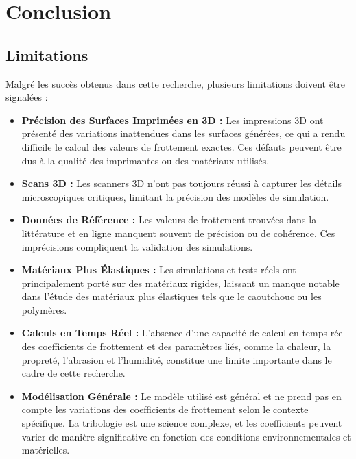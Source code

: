\chapter{Conclusion}

\section{Limitations}
Malgr\'e les succ\`es obtenus dans cette recherche, plusieurs limitations doivent \^{e}tre signal\'ees :
\begin{itemize}
    \item \textbf{Pr\'ecision des Surfaces Imprim\'ees en 3D :} Les impressions 3D ont pr\'esent\'e des variations inattendues dans les surfaces g\'en\'er\'ees, ce qui a rendu difficile le calcul des valeurs de frottement exactes. Ces d\'efauts peuvent \^{e}tre dus \`a la qualit\'e des imprimantes ou des mat\'eriaux utilis\'es.
    \item \textbf{Scans 3D :} Les scanners 3D n'ont pas toujours r\'eussi \`a capturer les d\'etails microscopiques critiques, limitant la pr\'ecision des mod\`eles de simulation.
    \item \textbf{Donn\'ees de R\'ef\'erence :} Les valeurs de frottement trouv\'ees dans la litt\'erature et en ligne manquent souvent de pr\'ecision ou de coh\'erence. Ces impr\'ecisions compliquent la validation des simulations.
    \item \textbf{Mat\'eriaux Plus \'Elastiques :} Les simulations et tests r\'eels ont principalement port\'e sur des mat\'eriaux rigides, laissant un manque notable dans l'\'etude des mat\'eriaux plus \'elastiques tels que le caoutchouc ou les polym\`eres.
    \item \textbf{Calculs en Temps R\'eel :} L'absence d'une capacit\'e de calcul en temps r\'eel des coefficients de frottement et des param\`etres li\'es, comme la chaleur, la propret\'e, l'abrasion et l'humidit\'e, constitue une limite importante dans le cadre de cette recherche.
    \item \textbf{Mod\'elisation G\'en\'erale :} Le mod\`ele utilis\'e est g\'en\'eral et ne prend pas en compte les variations des coefficients de frottement selon le contexte sp\'ecifique. La tribologie est une science complexe, et les coefficients peuvent varier de mani\`ere significative en fonction des conditions environnementales et mat\'erielles.
\end{itemize}


